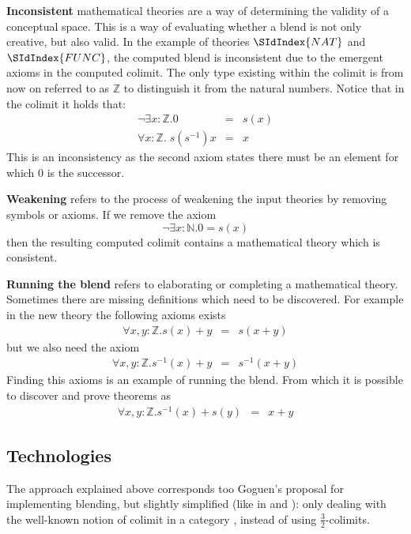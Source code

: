 {\bf Inconsistent} mathematical theories are a way of determining the
validity of a conceptual space. This is a way of evaluating whether a
blend is not only creative, but also valid. In the example of theories
$\SIdIndex{NAT}$ and $\SIdIndex{FUNC}$,
the computed blend is inconsistent due to the emergent axioms in the
computed colimit. The only type existing within the colimit is from now
on referred to as $\mathbb{Z}$ to distinguish it from the natural
numbers. Notice that in the colimit it holds that:
\begin{eqnarray*}
\neg \exists x: \mathbb{Z}. 0 &=&s(x)\\
\forall x:\mathbb{Z}.\;s(s^{-1}) x &=& x
\end{eqnarray*}
This is an inconsistency as the second axiom states there must be an
element for which 0 is the successor.

{\bf Weakening} refers to the process of weakening the input
theories by removing symbols or axioms. If we remove the axiom 
$$
\neg \exists x: \mathbb{N}. 0 = s(x)
$$
then the resulting computed colimit contains a mathematical theory
which is consistent.

{\bf Running the blend} refers to elaborating or completing a
mathematical theory. Sometimes there are missing definitions which
need to be discovered. For example in the new theory the following
axioms exists
\begin{eqnarray*}
\forall x,y:\mathbb{Z}. s(x) + y &=& s(x+y)
\end{eqnarray*}
but we also need the axiom
\begin{eqnarray*}
\forall x,y:\mathbb{Z}. s^{-1}(x) + y &=& s^{-1}(x+y)
\end{eqnarray*}
Finding this axioms is an example of running the blend. From which it
is possible to discover and prove 
theorems as
\begin{eqnarray*}
\forall x,y:\mathbb{Z}. s^{-1}(x) + s(y) &=& x+y
\end{eqnarray*}

\subsection{Technologies}


The approach explained above corresponds too
Goguen's proposal \cite{Go99c} for
implementing blending, but slightly simplified (like in
\cite{KuMoHoBhBa12} and \cite{KuMoNeCo14}): only dealing with
the well-known notion of colimit in a category \cite{Gog91}, instead of
using $\frac{3}{2}$-colimits.

